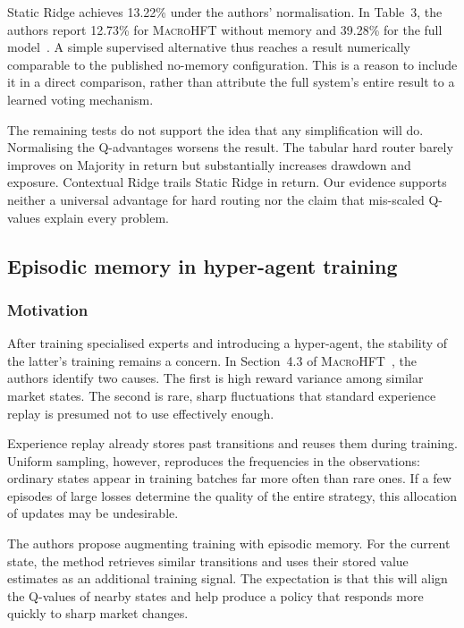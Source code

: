 \documentclass[9pt,a4paper,twocolumn]{extarticle}
\newcommand{\Macro}{\textsc{MacroHFT}}
\begin{document}
Static Ridge achieves 13.22\% under the authors' normalisation. In Table~3, the authors report
12.73\% for \Macro{} without memory and 39.28\% for the full model~\cite{zong2024macrohft}. A
simple supervised alternative thus reaches a result numerically comparable to the published
no-memory configuration. This is a reason to include it in a direct comparison, rather than
attribute the full system's entire result to a learned voting mechanism.

The remaining tests do not support the idea that any simplification will do. Normalising the
Q-advantages worsens the result. The tabular hard router barely improves on Majority in return
but substantially increases drawdown and exposure. Contextual Ridge trails Static Ridge in
return. Our evidence supports neither a universal advantage for hard routing nor the claim that
mis-scaled Q-values explain every problem.

\subsection{Episodic memory in hyper-agent training}
\label{sec:memory}

\subsubsection{Motivation}

After training specialised experts and introducing a hyper-agent, the stability of the latter's
training remains a concern. In Section~4.3 of \Macro{}~\cite{zong2024macrohft}, the authors
identify two causes. The first is high reward variance among similar market states. The second is
rare, sharp fluctuations that standard experience replay is presumed not to use effectively
enough.

Experience replay already stores past transitions and reuses them during training. Uniform
sampling, however, reproduces the frequencies in the observations: ordinary states appear in
training batches far more often than rare ones. If a few episodes of large losses determine the
quality of the entire strategy, this allocation of updates may be undesirable.

The authors propose augmenting training with episodic memory. For the current state, the method
retrieves similar transitions and uses their stored value estimates as an additional training
signal. The expectation is that this will align the Q-values of nearby states and help produce a
policy that responds more quickly to sharp market changes.
\end{document}
